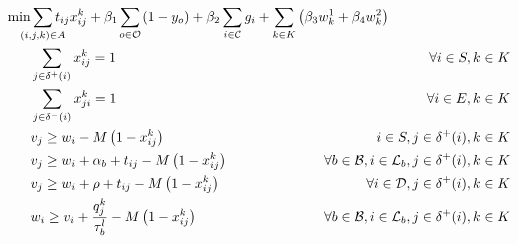 \documentclass{article}
\begin{document}
\begin{alignat}{3}
    \label{mod:obj}   \min & \smashoperator{ \sum_{ \substack{(i,j,k) \in A} }} {t_{ij}x^{k}_{ij}} + \beta_1\smashoperator{\sum_{ o \in \mathcal{O}}}{  \left(1-y_o\right)} \hspace{-0mm}  + \beta_2 \smashoperator{ \sum_{i \in \mathcal{C} } } { g_i  } +  \sum_{k \in K}\left({\beta_3 w^{1}_k  + \beta_4  w^{2}_k}\right)  &                         \\
    \label{mod:c1}         & \sum_{j \in \delta^{+}(i) }{x^k_{ij}} =1       & \forall i \in S, k \in K                                                                         \\
    \label{mod:c2}         & \sum_{j \in \delta^{-}(i)}{x^k_{ji}} = 1   & \forall i \in E, k \in K                                                                         \\
    \label{mod:c03}        & v_j \geq  w_i  - M\left(1-x^{k}_{ij}\right)                                                                                                                                                                                                                                            & \hspace{-20mm}  i \in S, j \in \delta^{+}(i),  k \in K                                           \\
    \label{mod:c3}         & v_j \geq  w_i + \alpha_{b} + t_{ij} - M\left(1-x^{k}_{ij}\right)                                                                                                                                                                                                                       & \hspace{-20mm} \forall b \in \mathcal{B}, i \in \mathcal{L}_b, j \in \delta^{+}(i),  k \in K     \\
    \label{mod:c4}         & v_j \geq  w_i + \rho + t_{ij} - M\left(1-x^{k}_{ij}\right)                                                                                                                                                                                                                           & \hspace{-20mm} \forall i \in \mathcal{D}  , j \in \delta^{+}(i), k \in K                         \\
    \label{mod:c5}         & w_{i} \geq v_{i}  + \frac{q^k_j}{\tau^l_b} -M\left(1- x^{k}_{ij}\right)                                                                                                                                                                                                                & \hspace{-20mm} \forall  b \in \mathcal{B},  i \in \mathcal{L}_{b},  j \in \delta^{+}(i), k \in K \\

\end{alignat}
\end{document}
